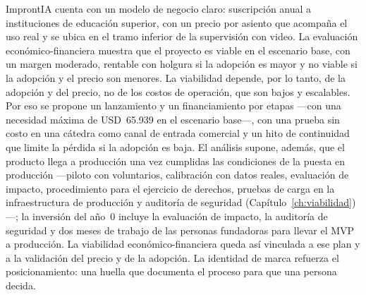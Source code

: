ImprontIA cuenta con un modelo de negocio claro: suscripción anual a instituciones de educación superior, con un precio por asiento que acompaña el uso real y se ubica en el tramo inferior de la supervisión con video. La evaluación económico-financiera muestra que el proyecto es viable en el escenario base, con un margen moderado, rentable con holgura si la adopción es mayor y no viable si la adopción y el precio son menores. La viabilidad depende, por lo tanto, de la adopción y del precio, no de los costos de operación, que son bajos y escalables. Por eso se propone un lanzamiento y un financiamiento por etapas ---con una necesidad máxima de USD~65.939 en el escenario base---, con una prueba sin costo en una cátedra como canal de entrada comercial y un hito de continuidad que limite la pérdida si la adopción es baja. El análisis supone, además, que el producto llega a producción una vez cumplidas las condiciones de la puesta en producción ---piloto con voluntarios, calibración con datos reales, evaluación de impacto, procedimiento para el ejercicio de derechos, pruebas de carga en la infraestructura de producción y auditoría de seguridad (Capítulo~\ref{ch:viabilidad})---; la inversión del año~0 incluye la evaluación de impacto, la auditoría de seguridad y dos meses de trabajo de las personas fundadoras para llevar el MVP a producción. La viabilidad económico-financiera queda así vinculada a ese plan y a la validación del precio y de la adopción. La identidad de marca refuerza el posicionamiento: una huella que documenta el proceso para que una persona decida.
